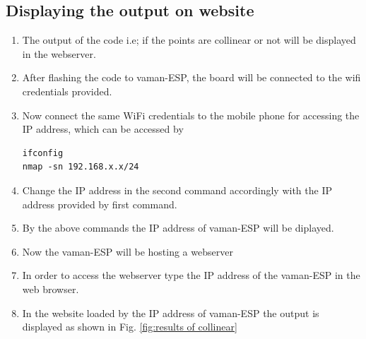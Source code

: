 \subsection{Displaying the output  on website}
\begin{enumerate}[label=\thesection.\arabic*.,ref=\thesection.\theenumi]
\item The output of the code i.e; if the points are collinear or not will be displayed in the webserver.
\item After flashing the code to vaman-ESP, the board will be connected to the wifi credentials provided.
\item Now connect the same WiFi credentials to the mobile phone for accessing the IP address, which can be accessed by 
\begin{lstlisting}
ifconfig
nmap -sn 192.168.x.x/24
\end{lstlisting}
\item Change the IP address in the second command accordingly with the IP address provided by first command.
\item By the above commands the IP address of vaman-ESP will be diplayed.
\item Now the vaman-ESP will be hosting a webserver
\item In order to access the webserver type the IP address of the vaman-ESP in the web browser.
\item In the website loaded by the IP address of vaman-ESP the output is displayed as shown in Fig. \ref{fig:results of collinear}
\begin{figure}[H]
\centering

\end{figure}
\end{enumerate}
